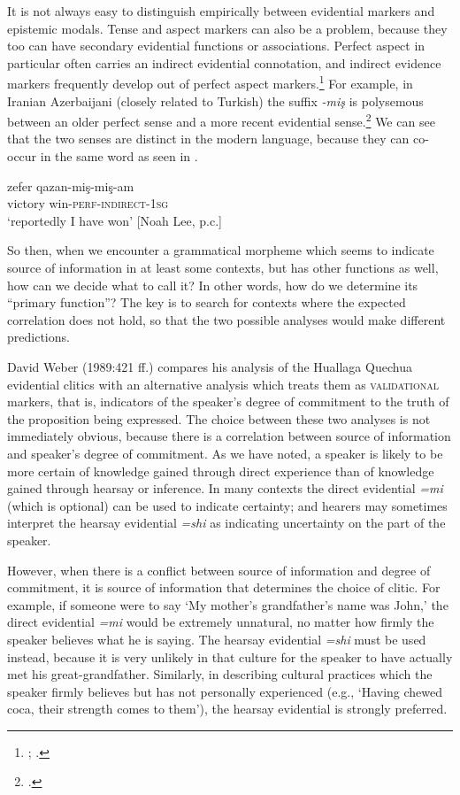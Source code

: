 It is not always easy to distinguish empirically between evidential markers and epistemic modals. Tense and aspect markers can also be a problem, because they too can have secondary evidential functions or associations. Perfect aspect in particular often carries an indirect evidential connotation, and indirect evidence markers frequently develop out of perfect aspect markers.\footnote{\citet{Izvorski1997}; \citet{BybeeEtAl1994}.} For example, in Iranian Azerbaijani (closely related to Turkish) the suffix \textit{-miş} is polysemous between an older perfect sense and a more recent evidential sense.\footnote{\citet{Lee2008}.} We can see that the two senses are distinct in the modern language, because they can co-occur in the same word as seen in .


\ea
\gll zefer  qazan-miş-miş-am\\
victory  win-\textsc{perf}-\textsc{indirect-1sg}\\
\glt ‘reportedly I have won’  [Noah Lee, p.c.]
\z


So then, when we encounter a grammatical morpheme which seems to indicate source of information in at least some contexts, but has other functions as well, how can we decide what to call it? In other words, how do we determine its “primary function”? The key is to search for contexts where the expected correlation does not hold, so that the two possible analyses would make different predictions.



David Weber (1989:421 ff.) compares his analysis of the Huallaga Quechua evidential clitics with an alternative analysis which treats them as \textsc{validational} markers, that is, indicators of the speaker’s degree of commitment to the truth of the proposition being expressed. The choice between these two analyses is not immediately obvious, because there is a correlation between source of information and speaker’s degree of commitment. As we have noted, a speaker is likely to be more certain of knowledge gained through direct experience than of knowledge gained through hearsay or inference. In many contexts the direct evidential \textit{=mi} (which is optional) can be used to indicate certainty; and hearers may sometimes interpret the hearsay evidential \textit{=shi} as indicating uncertainty on the part of the speaker.



However, when there is a conflict between source of information and degree of commitment, it is source of information that determines the choice of clitic. For example, if someone were to say ‘My mother’s grandfather’s name was John,’ the direct evidential \textit{=mi} would be extremely unnatural, no matter how firmly the speaker believes what he is saying. The hearsay evidential \textit{=shi} must be used instead, because it is very unlikely in that culture for the speaker to have actually met his great-grandfather. Similarly, in describing cultural practices which the speaker firmly believes but has not personally experienced (e.g., ‘Having chewed coca, their strength comes to them’), the hearsay evidential is strongly preferred.



